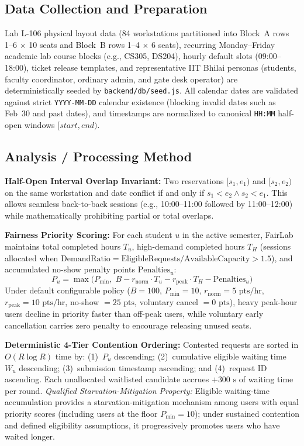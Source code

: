 \documentclass[manuscript,screen,review]{acmart}
\begin{document}
\subsection{Data Collection and Preparation}
Lab L-106 physical layout data (84 workstations partitioned into Block~A rows 1--6 $\times$ 10 seats and Block~B rows 1--4 $\times$ 6 seats), recurring Monday--Friday academic lab course blocks (e.g., CS305, DS204), hourly default slots (09:00--18:00), ticket release templates, and representative IIT Bhilai personas (students, faculty coordinator, ordinary admin, and gate desk operator) are deterministically seeded by \texttt{backend/db/seed.js}. All calendar dates are validated against strict \texttt{YYYY-MM-DD} calendar existence (blocking invalid dates such as Feb~30 and past dates), and timestamps are normalized to canonical \texttt{HH:MM} half-open windows $[start, end)$.

\subsection{Analysis / Processing Method}
\textbf{Half-Open Interval Overlap Invariant:} Two reservations $[s_1, e_1)$ and $[s_2, e_2)$ on the same workstation and date conflict if and only if $s_1 < e_2 \land s_2 < e_1$. This allows seamless back-to-back sessions (e.g., 10:00--11:00 followed by 11:00--12:00) while mathematically prohibiting partial or total overlaps.

\textbf{Fairness Priority Scoring:} For each student $u$ in the active semester, FairLab maintains total completed hours $T_u$, high-demand completed hours $T_H$ (sessions allocated when $\text{DemandRatio} = \text{EligibleRequests} / \text{AvailableCapacity} > 1.5$), and accumulated no-show penalty points $\text{Penalties}_u$:
\begin{equation}
  P_u = \max\bigl(P_{\min},\; B - r_{\text{norm}}\cdot T_u - r_{\text{peak}}\cdot T_H - \text{Penalties}_u\bigr)
  \label{eq:fairness}
\end{equation}
Under default configurable policy ($B=100$, $P_{\min}=10$, $r_{\text{norm}}=5\text{ pts/hr}$, $r_{\text{peak}}=10\text{ pts/hr}$, no-show $=25\text{ pts}$, voluntary cancel $=0\text{ pts}$), heavy peak-hour users decline in priority faster than off-peak users, while voluntary early cancellation carries zero penalty to encourage releasing unused seats.

\textbf{Deterministic 4-Tier Contention Ordering:} Contested requests are sorted in $O(R\log R)$ time by: (1)~$P_u$ descending; (2)~cumulative eligible waiting time $W_u$ descending; (3)~submission timestamp ascending; and (4)~request ID ascending. Each unallocated waitlisted candidate accrues $+300\text{ s}$ of waiting time per round. \textit{Qualified Starvation-Mitigation Property:} Eligible waiting-time accumulation provides a starvation-mitigation mechanism among users with equal priority scores (including users at the floor $P_{\min}=10$); under sustained contention and defined eligibility assumptions, it progressively promotes users who have waited longer.
\end{document}
